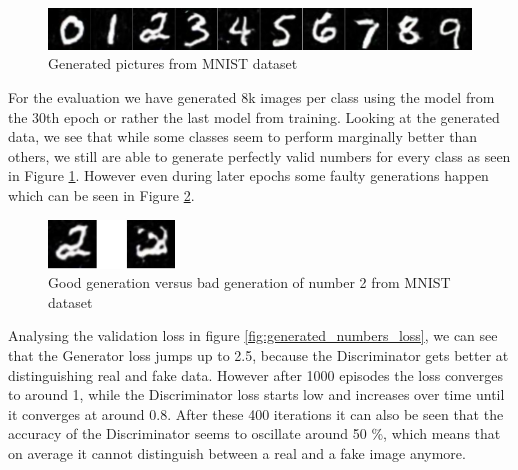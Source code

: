 \documentclass[13pt]{article}
\begin{document}
\begin{figure}[h!]
\centering
\centerline{\includegraphics[width=\textwidth]{plots/numbers.png}}
\caption{Generated pictures from MNIST dataset}
\label{fig:generated_numbers}
\end{figure}

For the evaluation we have generated 8k images per class using the model from the 30th epoch or rather the last model from training.
Looking at the generated data, we see that while some classes seem to perform marginally better than others, we still are able to generate perfectly valid numbers for every class as seen in Figure \ref{fig:generated_numbers}. However even during later epochs some faulty generations happen which can be seen in Figure \ref{fig:generated_numbers_bad}.

\begin{figure}[h!]
\centering
\centerline{\includegraphics[width=0.3\textwidth]{plots/numbers_bad_generation.png}}
\caption{Good generation versus bad generation of number 2 from MNIST dataset}
\label{fig:generated_numbers_bad}
\end{figure}

Analysing the validation loss in figure \ref{fig:generated_numbers_loss}, we can see that the Generator loss jumps up to 2.5, because the Discriminator gets better at distinguishing real and fake data. However after 1000 episodes the loss converges to around 1, while the Discriminator loss starts low and increases over time until it converges at around 0.8. After these 400 iterations it can also be seen that the accuracy of the Discriminator seems to oscillate around 50 \%, which means that on average it cannot distinguish between a real and a fake image anymore.
\end{document}
